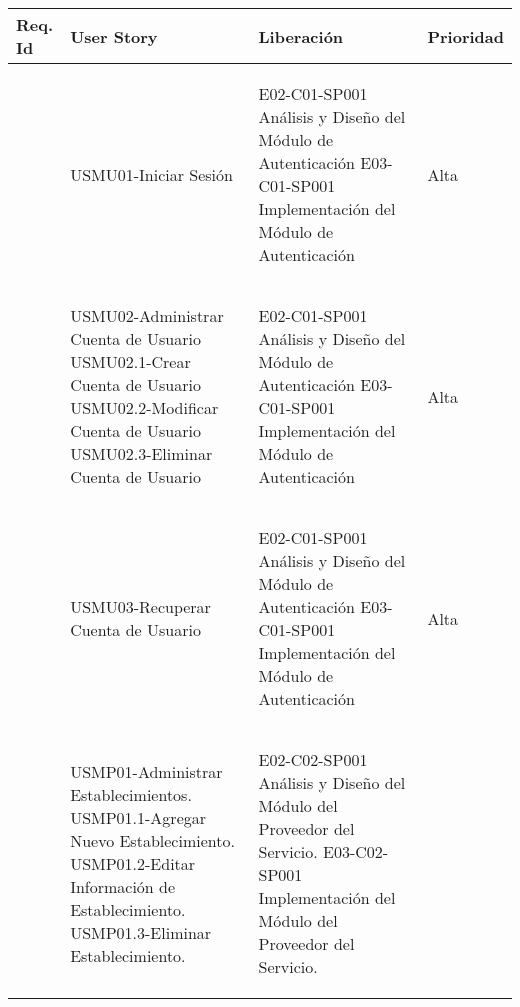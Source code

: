 \begin{center}
\begin{longtable}{|p{}|p{}|p{}|p{}|}
\hline
	\rowcolor{principal}
	\bf\color{white}Req. Id&\bf\color{white}User Story &\bf\color{white}Liberación&\bf\color{white}Prioridad\\
	\endhead
\hline

	\getElementById[Requerimiento]{REQMU01} & USMU01-Iniciar Sesión & \begin{Titemize}
																		\Titem E02-C01-SP001 Análisis y Diseño del Módulo de Autenticación
																		\Titem E03-C01-SP001 Implementación del Módulo de Autenticación

																	 \end{Titemize} & Alta\\
\hline
	\getElementById[Requerimiento]{REQMU02} & \begin{Titemize}
												\Titem USMU02-Administrar Cuenta de Usuario
												\Titem USMU02.1-Crear Cuenta de Usuario
												\Titem USMU02.2-Modificar Cuenta de Usuario
												\Titem USMU02.3-Eliminar Cuenta de Usuario
											  \end{Titemize} & \begin{Titemize}
																\Titem E02-C01-SP001 Análisis y Diseño del Módulo de Autenticación	
																\Titem E03-C01-SP001 Implementación del Módulo de Autenticación	
																\end{Titemize} & Alta\\
\hline
	\getElementById[Requerimiento]{REQMU03} & USMU03-Recuperar Cuenta de Usuario &
	\begin{Titemize}
		\Titem E02-C01-SP001 Análisis y Diseño del Módulo de Autenticación
		\Titem E03-C01-SP001 Implementación del Módulo de Autenticación
	\end{Titemize}
	 & Alta\\
\hline
	\getElementById[Requerimiento]{REQMP01} & \begin{Titemize}
												\Titem USMP01-Administrar Establecimientos.
												\Titem USMP01.1-Agregar Nuevo Establecimiento.
												\Titem USMP01.2-Editar Información de Establecimiento.
												\Titem USMP01.3-Eliminar Establecimiento.
											  \end{Titemize} & \begin{Titemize}
																\Titem E02-C02-SP001 Análisis y Diseño del Módulo del Proveedor del Servicio.
																\Titem E03-C02-SP001 Implementación del Módulo del Proveedor del Servicio.

\end{Titemize}
\end{longtable}
\end{center}
